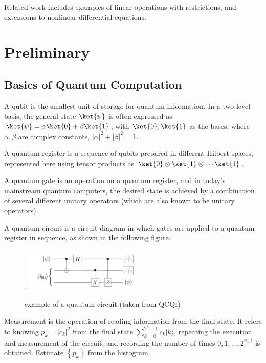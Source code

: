\documentclass[b5paper,papersize,dvipdfmx,fleqn]{jsarticle}
\begin{document}
Related work includes examples of linear operations with restrictions, and extensions to nonlinear differential equations.

\section{Preliminary}
\subsection{Basics of Quantum Computation}
A qubit is the smallest unit of storage for quantum information. In a two-level basis, the general state $\ket{\psi }$ is often expressed as $\ket{\psi }=\alpha \ket{0}+\beta \ket{1}$, with $\ket{0}, \ket{1}$ as the bases, where $\alpha, \beta$ are complex constants, $|\alpha|^2 + |\beta|^2 = 1$.

A quantum register is a sequence of qubits prepared in different Hilbert spaces, represented here using tensor products as $\ket{0}\otimes \ket{1}\otimes \cdots \ket{1}$.

A quantum gate is an operation on a quantum register, and in today's mainstream quantum computers, the desired state is achieved by a combination of several different unitary operators (which are also known to be unitary operators).

A quantum circuit is a circuit diagram in which gates are applied to a quantum register in sequence, as shown in the following figure.
\begin{center}
  \begin{figure}[H].
    \centering
       \includegraphics[width=0.5\textwidth]{circuit.pdf}
       \caption{example of a quautum circuit (taken from QCQI)}
       \label{circuit}
  \end{figure}
\end{center}

Measurement is the operation of reading information from the final state. It refers to knowing $p_{k}=\left|c_{k}\right|^{2}$ from the final state $\sum_{k=0}^{2^{n}-1} c_{k}|k\rangle$, repeating the execution and measurement of the circuit, and recording the number of times $0,1, \ldots, 2^{n_{-} 1}$ is obtained. Estimate $\left\{p_{k}\right\}$ from the histogram.
\end{document}
